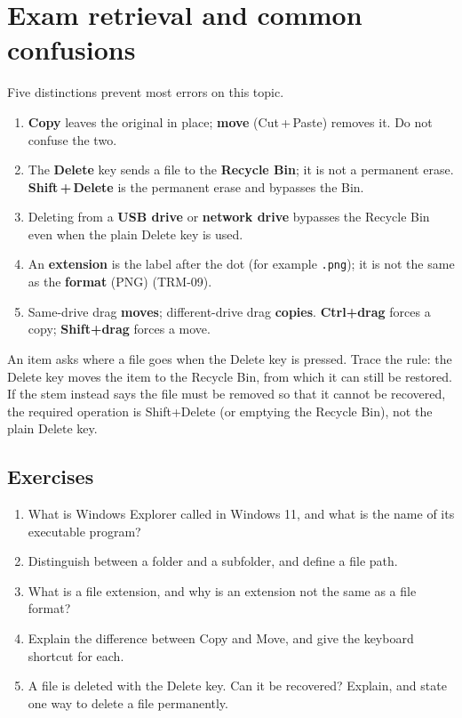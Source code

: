 \section{Exam retrieval and common confusions}
Five distinctions prevent most errors on this topic.
\begin{enumerate}
  \item \textbf{Copy} leaves the original in place; \textbf{move}
    (Cut\,+\,Paste) removes it. Do not confuse the two.
  \item The \textbf{Delete} key sends a file to the \textbf{Recycle Bin}; it
    is not a permanent erase. \textbf{Shift\,+\,Delete} is the permanent
    erase and bypasses the Bin.
  \item Deleting from a \textbf{USB drive} or \textbf{network drive} bypasses
    the Recycle Bin even when the plain Delete key is used.
  \item An \textbf{extension} is the label after the dot (for example
    \texttt{.png}); it is not the same as the \textbf{format} (PNG)
    (TRM-09).
  \item Same-drive drag \textbf{moves}; different-drive drag \textbf{copies}.
    \textbf{Ctrl+drag} forces a copy; \textbf{Shift+drag} forces a move.
\end{enumerate}

\begin{example}
An item asks where a file goes when the Delete key is pressed. Trace the rule:
the Delete key moves the item to the Recycle Bin, from which it can still be
restored. If the stem instead says the file must be removed so that it cannot
be recovered, the required operation is Shift+Delete (or emptying the Recycle
Bin), not the plain Delete key.
\end{example}

\subsection*{Exercises}
\begin{enumerate}[label=\arabic*.]
  \item What is Windows Explorer called in Windows 11, and what is the name
    of its executable program?
  \item Distinguish between a folder and a subfolder, and define a file path.
  \item What is a file extension, and why is an extension not the same as a
    file format?
  \item Explain the difference between Copy and Move, and give the keyboard
    shortcut for each.
  \item A file is deleted with the Delete key. Can it be recovered? Explain,
    and state one way to delete a file permanently.
\end{enumerate}

